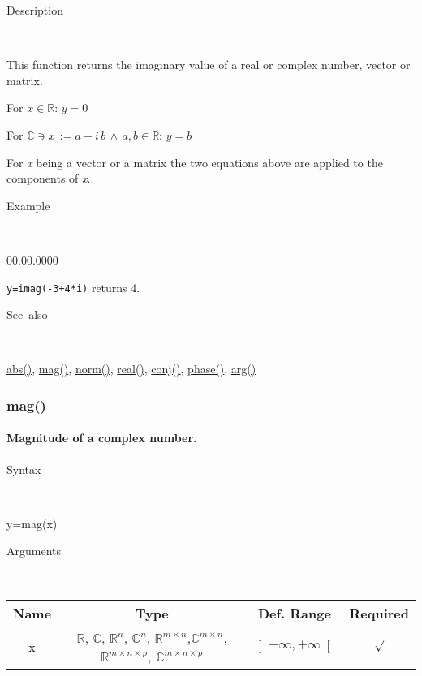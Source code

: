 \begin{description}
\item [Description]~
\end{description}
This function returns the imaginary value of a real or complex number,
vector or matrix.

\medskip{}
For $x\in\mathbb{R}$: $y=0$
\medskip{}

For $\mathbb{\mathbb{C}}\ni x\,:=a+i\, b\,\wedge\, a,b\in\mathbb{R}$:
$y=b$
\medskip{}

For \textit{x} being a vector or a matrix the two equations above
are applied to the components of \textit{x}.

\begin{description}
\item [Example]~
\end{description}
\begin{lyxlist}{00.00.0000}
\item [\texttt{y=imag(-3+4{*}i)}]returns 4.
\end{lyxlist}
\begin{description}
\item [See~also]~
\end{description}
\textcolor{blue}{\hyperlink{abs}{abs()}}, \textcolor{blue}{\hyperlink{mag}{mag()}},
\textcolor{blue}{\hyperlink{norm}{norm()}}, \textcolor{blue}{\hyperlink{real}{real()}},
\textcolor{blue}{\hyperlink{conj}{conj()}}, \textcolor{blue}{\hyperlink{phase}{phase()}},
\textcolor{blue}{\hyperlink{arg}{arg()}}

\newpage
\subsubsection*{\hypertarget{mag}{}{\Large mag()}}


\paragraph{\label{par:Magnitude}Magnitude of a complex number.}

\begin{description}
\item [Syntax]~
\end{description}
y=mag(x)

\begin{description}
\item [Arguments]~
\end{description}
\begin{tabular}{|c|c|c|c|}
\hline 
Name&
Type&
Def. Range&
Required\tabularnewline
\hline
\hline 
x&
$\mathbb{R}$, $\mathbb{C}$, $\mathbb{R}^{n}$, $\mathbb{C}^{n}$,
$\mathbb{\mathbb{R}}^{m\times n}$,$\mathbb{\mathbb{C}}^{m\times n}$,
$\mathbb{\mathbb{R}}^{m\times n\times p}$, $\mathbb{\mathbb{C}}^{m\times n\times p}$ &
$\left]-\infty,+\infty\right[$&
$\surd$\tabularnewline
\hline
\end{tabular}

